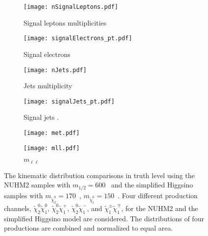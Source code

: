 \begin{figure}[htbp]
    \begin{center}
        \begin{subfigure}[b]{0.48\textwidth}
            \texttt{[image: nSignalLeptons.pdf]}
            \caption{Signal leptons multiplicities}
        \end{subfigure}
        \begin{subfigure}[b]{0.48\textwidth}
            \texttt{[image: signalElectrons\_pt.pdf]}
            \caption{Signal electrons \pt}
        \end{subfigure}
        \begin{subfigure}[b]{0.48\textwidth}
            \texttt{[image: nJets.pdf]}
            \caption{Jets multiplicity}
        \end{subfigure}
        \begin{subfigure}[b]{0.48\textwidth}
            \texttt{[image: signalJets\_pt.pdf]}
            \caption{Signal jets \pt.}
        \end{subfigure}
        \begin{subfigure}[b]{0.48\textwidth}
            \texttt{[image: met.pdf]}
            \caption{\met}
        \end{subfigure}
        \begin{subfigure}[b]{0.48\textwidth}
            \texttt{[image: mll.pdf]}
            \caption{$m_{\ell\ell}$}
        \end{subfigure}
    \end{center}
    \caption{The kinematic distribution comparisons in truth level using the NUHM2 samples with $m_{1/2} = 600$~{\GeV} and the simplified Higgsino samples with $m_{\widetilde{\chi}^{0}_{2}} = 170$~{\GeV}, $m_{\widetilde{\chi}^{0}_{1}} = 150$~{\GeV}.
    Four different production channels, $\widetilde{\chi}^{0}_{2}\widetilde{\chi}^{0}_{1}$, $\widetilde{\chi}^{0}_{2}\widetilde{\chi}^{+}_{1}$, $\widetilde{\chi}^{0}_{2}\widetilde{\chi}^{-}_{1}$, and $\widetilde{\chi}^{\pm}_{1}\widetilde{\chi}^{\mp}_{1}$, for the NUHM2 and the simplified Higgsino model are considered.
    The distributions of four productions are combined and normalized to equal area.}
    \label{fig:results_kinematic_distribution_comparisons}
\end{figure}

